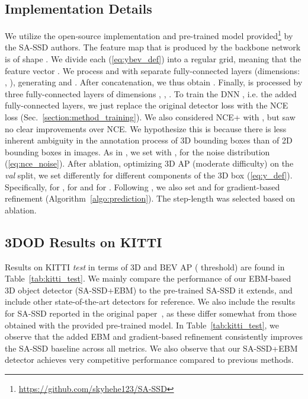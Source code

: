 \documentclass[letterpaper, 10 pt, conference]{ieeeconf}
\begin{document}
\subsection{Implementation Details}
We utilize the open-source implementation and pre-trained model provided\footnote{\url{https://github.com/skyhehe123/SA-SSD}} by the SA-SSD authors. The feature map  that is produced by the backbone network is of shape . We divide each  (\ref{eq:ybev_def}) into a regular  grid, meaning that the feature vector . We process  and  with separate fully-connected layers (dimensions: , ), generating  and . After concatenation, we thus obtain . Finally,  is processed by three fully-connected layers of dimensions , , . To train the DNN , i.e. the added fully-connected layers, we just replace the original detector loss with the NCE loss (Sec.~\ref{section:method_training}). We also considered NCE+ with , but saw no clear improvements over NCE. We hypothesize this is because there is less inherent ambiguity in the annotation process of 3D bounding boxes than of 2D bounding boxes in images. As in \cite{gustafsson2020train}, we set  with ,  for the noise distribution  (\ref{eq:nce_noise}). After ablation, optimizing 3D AP (moderate difficulty) on the \textit{val} split, we set  differently for different components of the 3D box  (\ref{eq:y_def}). Specifically,  for ,  for  and  for . Following \cite{gustafsson2019learning, gustafsson2020train}, we also set  and  for gradient-based refinement (Algorithm~\ref{algo:prediction}). The step-length  was selected based on ablation.






























\subsection{3DOD Results on KITTI}
Results on KITTI \textit{test} in terms of 3D and BEV AP ( threshold) are found in Table~\ref{tab:kitti_test}. We mainly compare the performance of our EBM-based 3D object detector (SA-SSD+EBM) to the pre-trained SA-SSD it extends, and include other state-of-the-art detectors for reference. We also include the results for SA-SSD reported in the original paper~\cite{he2020structure}, as these differ somewhat from those obtained with the provided pre-trained model. In Table~\ref{tab:kitti_test}, we observe that the added EBM and gradient-based refinement consistently improves the SA-SSD baseline across all metrics. We also observe that our SA-SSD+EBM detector achieves very competitive performance compared to previous methods. 
\end{document}
